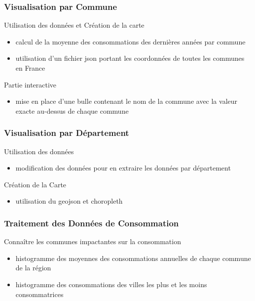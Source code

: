 \documentclass{beamer}
\begin{document}
\begin{frame}
\frametitle{Visualisation par Commune}
\begin{block}{Utilisation des données et Création de la carte}
\begin{itemize}
    \item calcul de la moyenne des consommations des dernières années par commune \\
    \item utilisation d'un fichier json portant les coordonnées de toutes les communes en France
\end{itemize}
\end{block}
\begin{block}{Partie interactive}
\begin{itemize}
    \item mise en place d'une bulle contenant le nom de la commune avec la valeur exacte au-dessus de chaque commune
\end{itemize}
\end{block}
\end{frame}

\begin{frame}
\frametitle{Visualisation par Département}
\begin{block}{Utilisation des données}
\begin{itemize}
    \item modification des données pour en extraire les données par département
\end{itemize}
\end{block}
\begin{block}{Création de la Carte}
\begin{itemize}
    \item utilisation du geojson et choropleth
\end{itemize}
\end{block}
\end{frame}

\begin{frame}
\frametitle{Traitement des Données de Consommation}
\begin{block}{Connaître les communes impactantes sur la consommation}
\begin{itemize}
    \item  histogramme des moyennes des consommations annuelles de chaque commune de la région
    \item  histogramme des consommations des villes les plus et les moins consommatrices
\end{itemize}
\end{block}
\end{frame}
\end{document}
